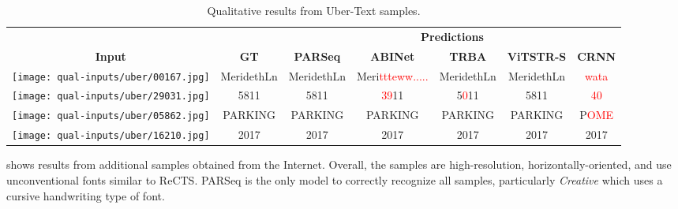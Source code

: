 \begin{table*}[htb]
  \centering
  \setlength\tabcolsep{4pt}
  \scriptsize
  \caption{Qualitative results from Uber-Text samples.}
  \begin{tabular}{ c c c c c c c }
    \toprule
    & & \multicolumn{5}{c}{\textbf{Predictions}} \\
    \cmidrule{3-7}
    \textbf{Input} & \textbf{GT} & \textbf{PARSeq} & \textbf{ABINet} & \textbf{TRBA} & \textbf{ViTSTR-S} & \textbf{CRNN} \\
    \midrule
    \texttt{[image: qual-inputs/uber/00167.jpg]} & MeridethLn & MeridethLn & Meri\textcolor{red}{ttteww.....} & MeridethLn & MeridethLn & \textcolor{red}{wata} \\
    \texttt{[image: qual-inputs/uber/29031.jpg]} & 5811 & 5811 & \textcolor{red}{39}11 & 5\textcolor{red}{0}11 & 5811 & \textcolor{red}{40} \\
    \texttt{[image: qual-inputs/uber/05862.jpg]} & PARKING & PARKING & PARKING & PARKING & PARKING & P\textcolor{red}{OME} \\
    \texttt{[image: qual-inputs/uber/16210.jpg]} & 2017 & 2017 & 2017 & 2017 & 2017 & 2017 \\
\bottomrule
  \end{tabular}
  \label{tab:qual-results-uber}
\end{table*}

 shows results from additional samples obtained from the Internet. Overall, the samples are high-resolution, horizontally-oriented, and use unconventional fonts similar to ReCTS. PARSeq is the only model to correctly recognize all samples, particularly \textit{Creative} which uses a cursive handwriting type of font.

